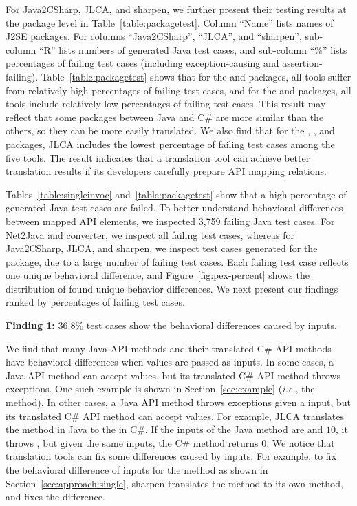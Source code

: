 For Java2CSharp, JLCA, and sharpen, we further present their testing results at the package level in Table~\ref{table:packagetest}. Column ``Name'' lists names of J2SE packages. For columns ``Java2CSharp'', ``JLCA'', and ``sharpen'', sub-column ``R'' lists numbers of generated Java test cases, and sub-column ``\%'' lists percentages of failing test cases (including exception-causing and assertion-failing). Table~\ref{table:packagetest} shows that for the  and  packages, all tools suffer from relatively high percentages of failing test cases, and for the  and  packages, all tools include relatively low percentages of failing test cases. This result may reflect that some packages between Java and C\# are more similar than the others, so they can be more easily translated. We also find that for the , , and  packages, JLCA includes the lowest percentage of failing test cases among the five tools. The result indicates that a translation tool can achieve better translation results if its developers carefully prepare API mapping relations.


Tables~\ref{table:singleinvoc} and~\ref{table:packagetest} show that a high percentage of generated Java test cases are failed. To better understand behavioral differences between mapped API elements, we inspected 3,759 failing Java test cases. For Net2Java and converter, we inspect all failing test cases, whereas for Java2CSharp, JLCA, and sharpen, we inspect test cases generated for the  package, due to a large number of failing test cases. Each failing test case reflects one unique behavioral difference, and Figure~\ref{fig:pex-percent} shows the distribution of found unique behavior differences. We next present our findings ranked by percentages of failing test cases.


\textbf{Finding 1:} 36.8\% test cases show the behavioral differences caused by  inputs.

We find that many Java API methods and their translated C\# API methods have behavioral differences when  values are passed as inputs. In some cases, a Java API method can accept  values, but its translated C\# API method throws exceptions. One such example is shown in Section~\ref{sec:example} (\emph{i.e.}, the  method). In other cases, a Java API method throws exceptions given a  input, but its translated C\# API method can accept  values. For example, JLCA translates the  method in Java to the  in C\#. If the inputs of the Java method are  and $10$, it throws , but given the same inputs, the C\# method returns 0. We notice that translation tools can fix some differences caused by  inputs. For example, to fix the behavioral difference of  inputs for the  method as shown in Section~\ref{sec:approach:single}, sharpen translates the method to its own method, and fixes the difference.

